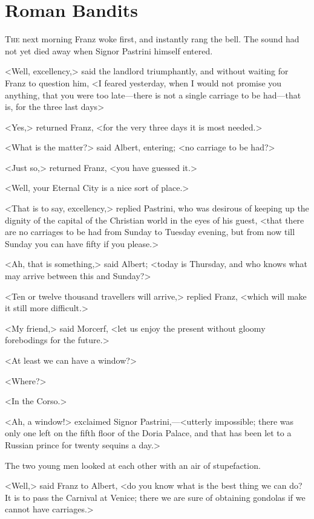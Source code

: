 \chapter{Roman Bandits} 

 \lettrine{T}{he} next morning Franz woke first, and instantly rang the bell. The sound had not yet died away when Signor Pastrini himself entered. 

\zz
 <Well, excellency,> said the landlord triumphantly, and without waiting for Franz to question him, <I feared yesterday, when I would not promise you anything, that you were too late—there is not a single carriage to be had—that is, for the three last days> 

 <Yes,> returned Franz, <for the very three days it is most needed.> 

 <What is the matter?> said Albert, entering; <no carriage to be had?> 

 <Just so,> returned Franz, <you have guessed it.> 

 <Well, your Eternal City is a nice sort of place.> 

 <That is to say, excellency,> replied Pastrini, who was desirous of keeping up the dignity of the capital of the Christian world in the eyes of his guest, <that there are no carriages to be had from Sunday to Tuesday evening, but from now till Sunday you can have fifty if you please.> 

 <Ah, that is something,> said Albert; <today is Thursday, and who knows what may arrive between this and Sunday?> 

 <Ten or twelve thousand travellers will arrive,> replied Franz, <which will make it still more difficult.> 

 <My friend,> said Morcerf, <let us enjoy the present without gloomy forebodings for the future.> 

 <At least we can have a window?> 

 <Where?> 

 <In the Corso.> 

 <Ah, a window!> exclaimed Signor Pastrini,—<utterly impossible; there was only one left on the fifth floor of the Doria Palace, and that has been let to a Russian prince for twenty sequins a day.> 

 The two young men looked at each other with an air of stupefaction. 

 <Well,> said Franz to Albert, <do you know what is the best thing we can do? It is to pass the Carnival at Venice; there we are sure of obtaining gondolas if we cannot have carriages.> 

